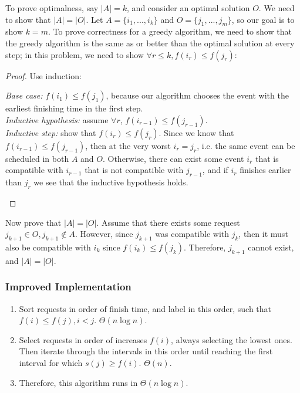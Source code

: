 \documentclass[11pt]{article}
\begin{document}
To prove optimalness, say $|A| = k$, and consider an optimal solution $O$. We need to show that $|A| = |O|$. Let $A = \{i_1, ..., i_k\}$ and $O = \{j_1, ..., j_m\}$, so our goal is to show $k=m$. To prove correctness for a greedy algorithm, we need to show that the greedy algorithm is the same as or better than the optimal solution at every step; in this problem, we need to show $\forall r \leq k, f(i_r) \leq f(j_r)$:
\begin{proof}
Use induction:
\begin{adjustwidth}{2em}{2em}

\textit{Base case:} $f(i_1) \leq f(j_1)$, because our algorithm chooses the event with the earliest finishing time in the first step. \\[.2em]
\textit{Inductive hypothesis:} assume $\forall r$, $f (i_{r-1}) \leq f(j_{r-1})$.\\[.2em]
\textit{Inductive step:} show that $f(i_r) \leq f(j_r)$. Since we know that $f(i_{r-1}) \leq f(j_{r-1})$, then at the very worst $i_r = j_r$, i.e. the same event can be scheduled in both $A$ and $O$. Otherwise, there can exist some event $i_r$ that is compatible with $i_{r-1}$ that is not compatible with $j_{r-1}$, and if $i_r$ finishes earlier than $j_r$ we see that the inductive hypothesis holds.
\end{adjustwidth}
\end{proof}
Now prove that $|A| = |O|$. Assume that there exists some request $j_{k+1} \in O, j_{k+1} \not\in A$. However, since $j_{k+1}$ was compatible with $j_k$, then it must also be compatible with $i_k$ since $f(i_k) \leq f(j_k)$. Therefore, $j_{k+1}$ cannot exist, and $|A| = |O|$.

\subsubsection{Improved Implementation}
\begin{enumerate}
    \item Sort requests in order of finish time, and label in this order, such that $f(i) \leq f(j), i < j$. $\Theta(n \log n)$.
    \item Select requests in order of increases $f(i)$, always selecting the lowest ones. Then iterate through the intervals in this order until reaching the first interval for which $s(j) \geq f(i)$. $\Theta(n)$.
    \item Therefore, this algorithm runs in $\Theta(n \log n)$.
\end{enumerate}
\end{document}
